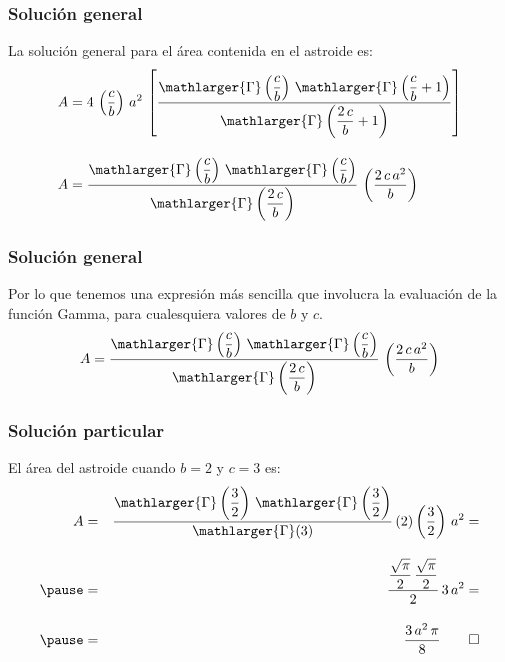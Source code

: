 \begin{frame}
\frametitle{Solución general}
La solución general para el área contenida en el astroide es:
\begin{align*}
A &= 4 \, \left( \dfrac{c}{b} \right) \, a^{2} \, \left[ \dfrac{\mathlarger{\Gamma} \left( \dfrac{c}{b} \right) \, \mathlarger{\Gamma} \left( \dfrac{c}{b} + 1 \right)}{\mathlarger{\Gamma} \left( \dfrac{2 \, c}{b} + 1 \right)} \right] \\[1em]
A &= \dfrac{\mathlarger{\Gamma} \left( \dfrac{c}{b} \right) \, \mathlarger{\Gamma} \left( \dfrac{c}{b} \right)}{\mathlarger{\Gamma} \left( \dfrac{2 \, c}{b} \right)} \, \left( \dfrac{2 \, c \, a^{2}}{b} \right)
\end{align*}
\end{frame}
\begin{frame}
\frametitle{Solución general}
Por lo que tenemos una expresión más sencilla que involucra la evaluación de la función Gamma, para cualesquiera valores de $b$ y $c$.
\begin{align*}
A = \dfrac{\mathlarger{\Gamma} \left( \dfrac{c}{b} \right) \, \mathlarger{\Gamma} \left( \dfrac{c}{b} \right)}{\mathlarger{\Gamma} \left( \dfrac{2 \, c}{b} \right)} \, \left( \dfrac{2 \, c \, a^{2}}{b} \right)
\end{align*}
\end{frame}
\begin{frame}
\frametitle{Solución particular}
El área del astroide cuando $b = 2$ y $c = 3$ es:
\begin{eqnarray*}
A &=& \dfrac{\mathlarger{\Gamma} \left( \dfrac{3}{2} \right) \, \mathlarger{\Gamma} \left( \dfrac{3}{2} \right)}{\mathlarger{\Gamma} (3)} \, (2) \left( \dfrac{3}{2} \right) \, a^{2} = \\[1em] \pause
&=& \dfrac{\dfrac{\sqrt{\pi}}{2} \, \dfrac{\sqrt{\pi}}{2}}{2} \, 3 \, a^{2} = \\[1em] \pause
&=& \dfrac{3 \, a^{2} \, \pi}{8} \qed
\end{eqnarray*}
\end{frame}
